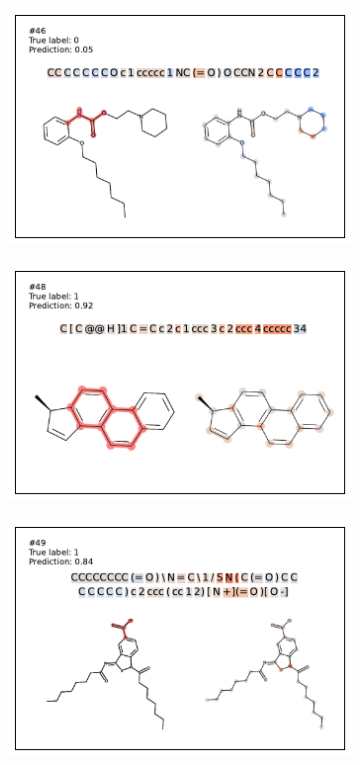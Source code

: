 \begin{figure}
\begin{subfigure}[b]{0.33\textwidth}
\end{subfigure}\begin{subfigure}[b]{0.33\textwidth} 
  \centering 
  \includegraphics[width=\textwidth]{figures/ames/ames46.pdf} 
\end{subfigure} 
\begin{subfigure}[b]{0.33\textwidth} 
  \centering 
  \includegraphics[width=\textwidth]{figures/ames/ames48.pdf} 
\end{subfigure}\begin{subfigure}[b]{0.33\textwidth} 
  \centering 
  \includegraphics[width=\textwidth]{figures/ames/ames49.pdf} 

\end{subfigure}
\end{figure}
